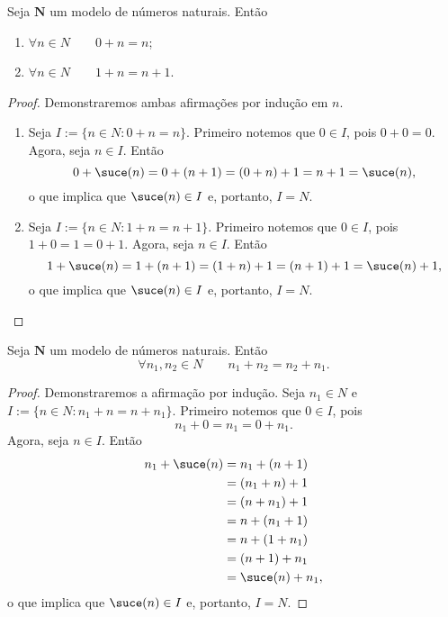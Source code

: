 \begin{lema} \label{conj.nat.lem.adi}
	Seja $\bm N$ um modelo de números naturais. Então
	\begin{enumerate}
	\item $\forall n \in N \qquad 0+n=n$;
	\item $\forall n \in N \qquad 1+n=n+1$.
	\end{enumerate}
\end{lema}
\begin{proof}
	Demonstraremos ambas afirmações por indução em $n$.
	\begin{enumerate}
	\item Seja $I := \{n \in N:0+n=n\}$. Primeiro notemos que $0 \in I$, pois $0+0=0$. Agora, seja $n \in I$. Então
	\begin{equation*}
	0+\suce(n)=0+(n+1)=(0+n)+1=n+1=\suce(n),
	\end{equation*}
o que implica que $\suce(n) \in I$ e, portanto, $I=N$.

	\item Seja $I := \{n \in N:1+n=n+1\}$. Primeiro notemos que $0 \in I$, pois $1+0=1=0+1$. Agora, seja $n \in I$. Então
	\begin{equation*}
	1+\suce(n)=1+(n+1)=(1+n)+1=(n+1)+1=\suce(n)+1,
	\end{equation*}
o que implica que $\suce(n) \in I$ e, portanto, $I=N$.
	\end{enumerate}
\end{proof}

\begin{teo}
	Seja $\bm N$ um modelo de números naturais. Então
	\begin{equation*}
	\forall n_1,n_2 \in N \qquad n_1+n_2 = n_2+n_1.
	\end{equation*}
\end{teo}
\begin{proof}
 	Demonstraremos a afirmação por indução. Seja $n_1 \in N$ e $I := \{n \in N:n_1+n=n+n_1\}$. Primeiro notemos que $0 \in I$, pois
 	\begin{equation*}
 	n_1+0=n_1=0+n_1.
 	\end{equation*}
Agora, seja $n \in I$. Então
 	\begin{align*}
 	n_1+\suce(n) &= n_1+(n+1) \\
 		&= (n_1+n)+1 \\
 		&= (n+n_1)+1 \\
 		&= n+(n_1+1) \\
 		&= n+(1+n_1) \\
 		&= (n+1)+n_1 \\
 		&= \suce(n)+n_1,
 	\end{align*}
 o que implica que $\suce(n) \in I$ e, portanto, $I=N$.
\end{proof}

